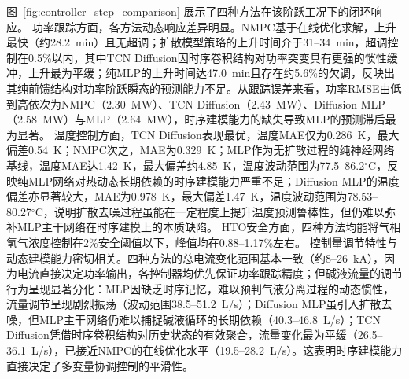 图~\ref{fig:controller_step_comparison} 展示了四种方法在该阶跃工况下的闭环响应。
功率跟踪方面，各方法动态响应差异明显。NMPC基于在线优化求解，上升最快（约28.2~min）且无超调；扩散模型策略的上升时间介于31--34~min，超调控制在0.5\%以内，其中TCN Diffusion因时序卷积结构对功率突变具有更强的惯性缓冲，上升最为平缓；纯MLP的上升时间达47.0~min且存在约5.6\%的欠调，反映出其纯前馈结构对功率阶跃瞬态的预测能力不足。从跟踪误差来看，功率RMSE由低到高依次为NMPC（2.30~MW）、TCN Diffusion（2.43~MW）、Diffusion MLP（2.58~MW）与MLP（2.64~MW），时序建模能力的缺失导致MLP的预测滞后最为显著。
温度控制方面，TCN Diffusion表现最优，温度MAE仅为0.286~K，最大偏差0.54~K；NMPC次之，MAE为0.329~K；MLP作为无扩散过程的纯神经网络基线，温度MAE达1.42~K，最大偏差约4.85~K，温度波动范围为77.5--86.2$^\circ$C，反映纯MLP网络对热动态长期依赖的时序建模能力严重不足；Diffusion MLP的温度偏差亦显著较大，MAE为0.978~K，最大偏差1.47~K，温度波动范围为78.53--80.27$^\circ$C，说明扩散去噪过程虽能在一定程度上提升温度预测鲁棒性，但仍难以弥补MLP主干网络在时序建模上的本质缺陷。
HTO安全方面，四种方法均能将气相氢气浓度控制在2\%安全阈值以下，峰值均在0.88--1.17\%左右。
控制量调节特性与动态建模能力密切相关。四种方法的总电流变化范围基本一致（约8--26~kA），因为电流直接决定功率输出，各控制器均优先保证功率跟踪精度；但碱液流量的调节行为呈现显著分化：MLP因缺乏时序记忆，难以预判气液分离过程的动态惯性，流量调节呈现剧烈振荡（波动范围38.5--51.2~L/s）；Diffusion MLP虽引入扩散去噪，但MLP主干网络仍难以捕捉碱液循环的长期依赖（40.3--46.8~L/s）；TCN Diffusion凭借时序卷积结构对历史状态的有效聚合，流量变化最为平缓（26.5--36.1~L/s），已接近NMPC的在线优化水平（19.5--28.2~L/s）。这表明时序建模能力直接决定了多变量协调控制的平滑性。

